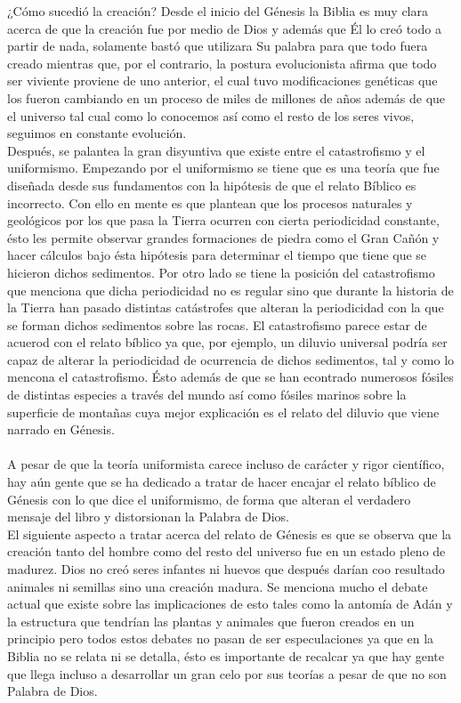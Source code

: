 \begin{section}{¿Cómo sucedió la creación?}
	Desde el inicio del Génesis la Biblia es muy clara acerca de que la creación fue por medio de Dios y además que Él lo creó todo a partir de nada, solamente bastó que utilizara Su palabra para que todo fuera creado mientras que, por el contrario, la postura evolucionista afirma que todo ser viviente proviene de uno anterior, el cual tuvo modificaciones genéticas que los fueron cambiando en un proceso de miles de millones de años además de que el universo tal cual como lo conocemos así como el resto de los seres vivos, seguimos en constante evolución.\\
	Después, se palantea la gran disyuntiva que existe entre el catastrofismo y el uniformismo. Empezando por el uniformismo se tiene que es una teoría que fue diseñada desde sus fundamentos con la hipótesis de que el relato Bíblico es incorrecto. Con ello en mente es que plantean que los procesos naturales y geológicos por los que pasa la Tierra ocurren con cierta periodicidad constante, ésto les permite observar grandes formaciones de piedra como el Gran Cañón y hacer cálculos bajo ésta hipótesis para determinar el tiempo que tiene que se hicieron dichos sedimentos. Por otro lado se tiene la posición del catastrofismo que menciona que dicha periodicidad no es regular sino que durante la historia de la Tierra han pasado distintas catástrofes que alteran la periodicidad con la que se forman dichos sedimentos sobre las rocas. El catastrofismo parece estar de acuerod con el relato bíblico ya que, por ejemplo, un diluvio universal podría ser capaz de alterar la periodicidad de ocurrencia de dichos sedimentos, tal y como lo mencona el catastrofismo. Ésto además de que se han econtrado numerosos fósiles de distintas especies a través del mundo así como fósiles marinos sobre la superficie de montañas cuya mejor explicación es el relato del diluvio que viene narrado en Génesis.\\
	\\
	A pesar de que la teoría uniformista carece incluso de carácter y rigor científico, hay aún gente que se ha dedicado a tratar de hacer encajar el relato bíblico de Génesis con lo que dice el uniformismo, de forma que alteran el verdadero mensaje del libro y distorsionan la Palabra de Dios.\\
El siguiente aspecto a tratar acerca del relato de Génesis es que se observa que la creación tanto del hombre como del resto del universo fue en un estado pleno de madurez. Dios no creó seres infantes ni huevos que después darían coo resultado animales ni semillas sino una creación madura. Se menciona mucho el debate actual que existe sobre las implicaciones de esto tales como la antomía de Adán y la estructura que tendrían las plantas y animales que fueron creados en un principio pero todos estos debates no pasan de ser especulaciones ya que en la Biblia no se relata ni se detalla, ésto es importante de recalcar ya que hay gente que llega incluso a desarrollar un gran celo por sus teorías a pesar de que no son Palabra de Dios.\\

\end{section}
